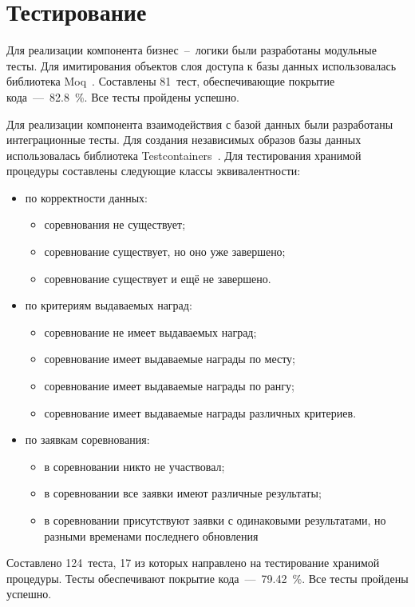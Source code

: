 \section{Тестирование}

Для реализации компонента бизнес~--~логики были разработаны модульные тесты. Для имитирования объектов слоя доступа к базы данных использовалась библиотека Moq~\cite{moq}. Составлены 81~тест, обеспечивающие покрытие кода~---~82.8~\%. Все тесты пройдены успешно.

Для реализации компонента взаимодействия с базой данных были разработаны интеграционные тесты. Для создания независимых образов базы данных использовалась библиотека Testcontainers~\cite{testcontainers}. 
Для тестирования хранимой процедуры составлены следующие классы эквивалентности:
\begin{itemize}
	\item по корректности данных:
	\begin{itemize}
		\item соревнования не существует;
		\item соревнование существует, но оно уже завершено;
		\item соревнование существует и ещё не завершено.
	\end{itemize}
	\item по критериям выдаваемых наград:
	\begin{itemize}
		\item соревнование не имеет выдаваемых наград;
		\item соревнование имеет выдаваемые награды по месту;
		\item соревнование имеет выдаваемые награды по рангу;
		\item соревнование имеет выдаваемые награды различных критериев.
	\end{itemize}
	\item по заявкам соревнования:
	\begin{itemize}
		\item в соревновании никто не участвовал;
		\item в соревновании все заявки имеют различные результаты;
		\item в соревновании присутствуют заявки с одинаковыми результатами, но разными временами последнего обновления
	\end{itemize}
\end{itemize}
Составлено 124~теста, 17 из которых направлено на тестирование хранимой процедуры. Тесты обеспечивают покрытие кода~---~79.42~\%. Все тесты пройдены успешно.

